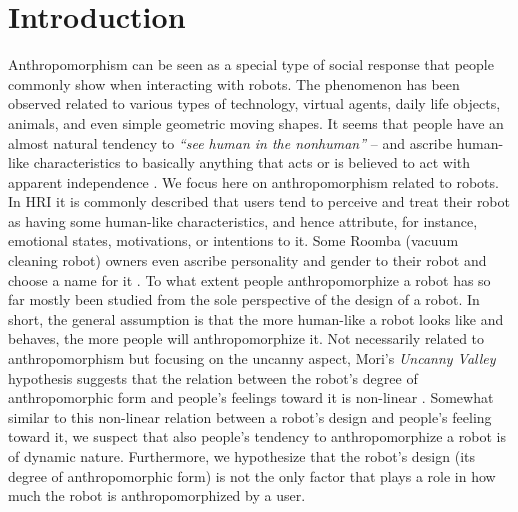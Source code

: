 \documentclass{frontiersSCNS} %
\begin{document}
%
%
%
%
%
%


\section{Introduction}
\label{sec:introduction}

Anthropomorphism can be seen as a special type of
social response that people commonly show when interacting with 
robots. The phenomenon has been observed related to various types of technology, virtual agents, daily life objects, animals, and even simple geometric moving shapes. It seems that people have an almost natural tendency to \textit{``see human in the nonhuman''} -- and ascribe human-like characteristics to basically anything that acts or is believed to act with apparent independence \citep{epley_seeing_2007}. We focus here on anthropomorphism related to robots. In HRI it is commonly described that users tend to perceive and treat their robot as having some human-like characteristics, and hence attribute, for instance, emotional states, motivations, or intentions to it. Some Roomba (vacuum cleaning robot) owners even ascribe personality and gender to their robot and choose a name for it \citep{forlizzi_service_2006,forlizzi_how_2007,krumm_my_2007,sung_domestic_2010}.
To what extent people anthropomorphize a robot has so far mostly been studied from the sole perspective of the design of a robot. In short, the general assumption is that the more human-like a robot looks like and behaves, the more people will anthropomorphize it.
Not necessarily related to anthropomorphism but focusing on the uncanny aspect, Mori's \textit{Uncanny Valley} hypothesis suggests that the relation between the robot's degree of anthropomorphic form and people's feelings toward it is non-linear \citep{mori_uncanny_1970,mori_uncanny_2012}.
Somewhat similar to this non-linear relation between a robot's design and people's feeling toward it, we suspect that also people's tendency to anthropomorphize a robot is of dynamic nature. Furthermore, we hypothesize that the robot's design (its degree of anthropomorphic form) is not the only factor that plays a role in how much the robot is anthropomorphized by a user.
\end{document}
